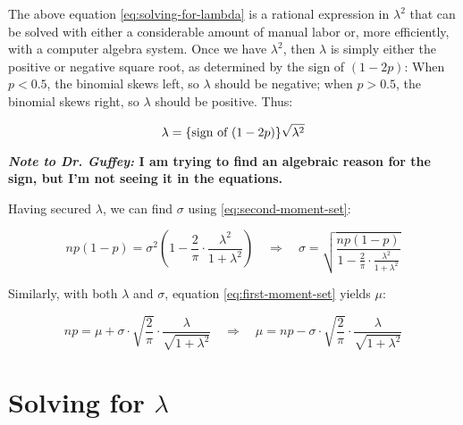 \documentclass{article}
\begin{document}
The above equation \eqref{eq:solving-for-lambda} is a rational expression in
$\lambda^2$ that can be solved with either a considerable amount of manual
labor or, more efficiently, with a computer algebra system. Once we have
$\lambda^2$, then $\lambda$ is simply either the positive or negative square
root, as determined by the sign of $(1-2p)$: When $p < 0.5$, the binomial skews
left, so $\lambda$ should be negative; when $p > 0.5$, the binomial skews
right, so $\lambda$ should be positive. Thus:

\begin{equation}
  \lambda = \textnormal{\{sign of $(1-2p)$\}} \sqrt{\lambda^2}
\end{equation}

\textbf{\textit{Note to Dr. Guffey:} I am trying to find an algebraic reason
for the sign, but I'm not seeing it in the equations.}

Having secured $\lambda$, we can find $\sigma$ using
\eqref{eq:second-moment-set}:

\begin{equation}
  np(1-p) = \sigma^2 \left( 1 - \frac{2}{\pi} \cdot \frac{\lambda^2}{1 + \lambda^2} \right) \quad\Rightarrow\quad
  \sigma = \sqrt{\frac{np(1-p)}{1 - \frac{2}{\pi} \cdot \frac{\lambda^2}{1 + \lambda^2}}}
\end{equation}

Similarly, with both $\lambda$ and $\sigma$, equation
\eqref{eq:first-moment-set} yields $\mu$:

\begin{equation}
  np = \mu + \sigma \cdot \sqrt{\frac{2}{\pi}} \cdot \frac{\lambda}{\sqrt{1 + \lambda^2}} \quad\Rightarrow\quad
  \mu = np - \sigma \cdot \sqrt{\frac{2}{\pi}} \cdot \frac{\lambda}{\sqrt{1 + \lambda^2}}
\end{equation}

\appendix
\section{Solving for $\lambda$}
\end{document}
